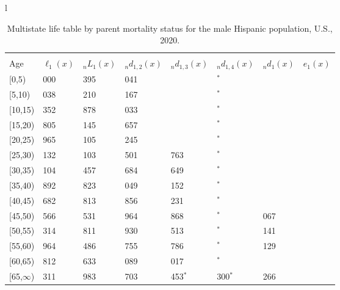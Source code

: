\documentclass[
]{article}
\begin{document}
\begin{table}
\caption{\label{tab:table-hispanic-male}Multistate life table by parent mortality status for the male Hispanic population, U.S., 2020.}

\centering
\fontsize{9}{11}\selectfont
\begin{tabular}[t]{l}
\hline
\begin{tabular}{>{\raggedright\arraybackslash}p{.45in}>{\raggedleft\arraybackslash}p{.65in}>{\raggedleft\arraybackslash}p{.65in}>{\raggedleft\arraybackslash}p{.65in}>{\raggedleft\arraybackslash}p{.65in}>{\raggedleft\arraybackslash}p{.65in}>{\raggedleft\arraybackslash}p{.65in}>{\raggedleft\arraybackslash}p{.65in}}
\toprule
\multicolumn{1}{c}{ } & \multicolumn{7}{c}{(1) Lost neither} \\
\cmidrule(l{3pt}r{3pt}){2-8}
Age & $\ell_{1}(x)$ & ${}_nL_{1}(x)$ & ${}_nd_{1,2}(x)$ & ${}_nd_{1,3}(x)$ & ${}_nd_{1,4}(x)$ & ${}_nd_{1}(x)$ & $e_{1}(x)$\\
\midrule
{}[0,5) & 100 000 & 494 395 & 1 041 & 200 & 139$^{*}$ & 582 & 45\\
{}[5,10) & 98 038 & 486 210 & 1 167 & 474 & 0$^{*}$ & 45 & 40\\
{}[10,15) & 96 352 & 476 878 & 1 033 & 441 & 0$^{*}$ & 74 & 35\\
{}[15,20) & 94 805 & 465 145 & 1 657 & 809 & 25$^{*}$ & 347 & 30\\
{}[20,25) & 91 965 & 446 105 & 2 245 & 941 & 12$^{*}$ & 635 & 26\\
\addlinespace
{}[25,30) & 88 132 & 421 103 & 2 501 & 1 763 & 0$^{*}$ & 764 & 21\\
{}[30,35) & 83 104 & 387 457 & 2 684 & 1 649 & 83$^{*}$ & 796 & 17\\
{}[35,40) & 77 892 & 347 823 & 5 049 & 2 152 & 112$^{*}$ & 897 & 13\\
{}[40,45) & 69 682 & 291 813 & 5 856 & 2 231 & 69$^{*}$ & 960 & 10\\
{}[45,50) & 60 566 & 234 531 & 6 964 & 2 868 & 353$^{*}$ & 1 067 & 7\\
\addlinespace
{}[50,55) & 49 314 & 167 811 & 5 930 & 3 513 & 765$^{*}$ & 1 141 & 5\\
{}[55,60) & 37 964 & 105 486 & 6 755 & 2 786 & 482$^{*}$ & 1 129 & 3\\
{}[60,65) & 26 812 & 58 633 & 3 089 & 3 017 & 471$^{*}$ & 924 & 2\\
{}[65,$\infty$) & 19 311 & 88 983 & 6 703 & 1 453$^{*}$ & 3 300$^{*}$ & 5 266 & 1\\
\end{tabular}\\

\end{tabular}
\end{table}
\end{document}
